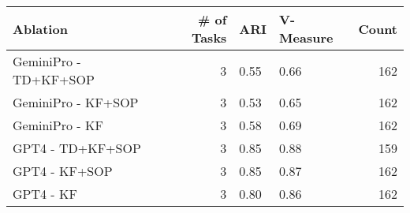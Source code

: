 \begin{tabular}{lrllr}
\toprule
Ablation & # of Tasks & ARI & V-Measure & Count \\
\midrule
GeminiPro - TD+KF+SOP & 3 & 0.55 & 0.66 & 162 \\
GeminiPro - KF+SOP & 3 & 0.53 & 0.65 & 162 \\
GeminiPro - KF & 3 & 0.58 & 0.69 & 162 \\
GPT4 - TD+KF+SOP & 3 & 0.85 & 0.88 & 159 \\
GPT4 - KF+SOP & 3 & 0.85 & 0.87 & 162 \\
GPT4 - KF & 3 & 0.80 & 0.86 & 162 \\
\bottomrule
\end{tabular}
